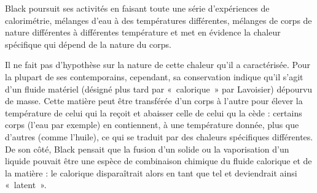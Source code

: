 	Black poursuit ses activités en faisant toute une série d'expériences de calorimétrie, mélanges d'eau à des températures différentes, mélanges de corps de nature différentes à différentes température et met en évidence la chaleur spécifique qui dépend de la nature du corps.

	Il ne fait pas d'hypothèse sur la nature de cette chaleur qu'il a caractérisée. Pour la plupart de ses contemporains, cependant, sa conservation indique qu'il s'agit d'un fluide matériel (désigné plus tard par «~calorique~» par Lavoisier) dépourvu de masse. Cette matière peut être transférée d'un corps à l'autre pour élever la température de celui qui la reçoit et abaisser celle de celui qu la cède : certains corps (l'eau par exemple) en contiennent, à une température donnée, plus que d'autres (comme l'huile), ce qui se traduit par des chaleurs spécifiques différentes. De son côté, Black pensait que la fusion d'un solide ou la vaporisation d'un liquide pouvait être une espèce de combinaison chimique du fluide calorique et de la matière : le calorique disparaîtrait alors en tant que tel et deviendrait ainsi «~latent~»\cite{locqueneux1996}.

\atendofhistorysection
